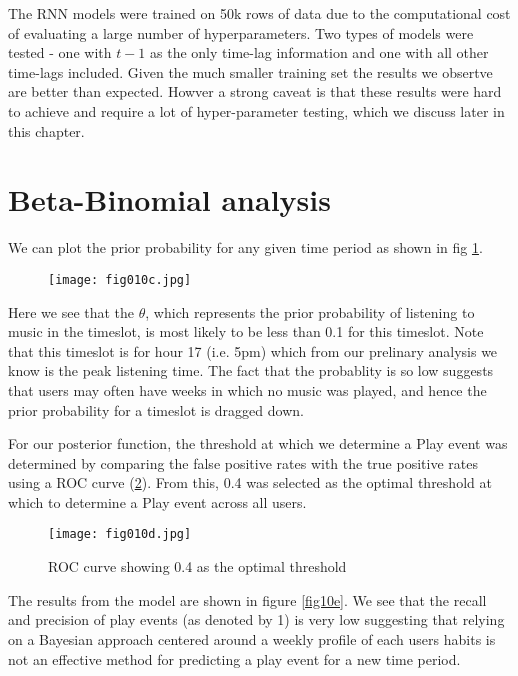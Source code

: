 The RNN models were trained on 50k rows of data due to the computational cost of evaluating a large number of hyperparameters. Two types of models were tested - one with $t-1$ as the only time-lag information and one with all other time-lags included. Given the much smaller training set the results we obsertve are better than expected. Howver a strong caveat is that these results were hard to achieve and require a lot of hyper-parameter testing, which we discuss later in this chapter.

\section{Beta-Binomial analysis}

We can plot the prior probability for any given time period as shown in fig \ref{fig10c}.

\begin{figure}[h!]
	\centering
	\texttt{[image: fig010c.jpg]}
	\caption{}
	\label{fig10c}
\end{figure} 

Here we see that the $\theta$, which represents the prior probability of listening to music in the timeslot, is most likely to be less than 0.1 for this timeslot. Note that this timeslot is for hour 17 (i.e. 5pm) which from our prelinary analysis we  know is the peak listening time. The fact that the probablity is so low suggests that users may often have weeks in which no music was played, and hence the prior probability for a timeslot is dragged down. 

For our posterior function, the threshold at which we determine a Play event was determined by comparing the false positive rates with the true positive rates using a ROC curve (\ref{fig10d}). From this, 0.4 was selected as the optimal threshold at which to determine a Play event across all users.

\begin{figure}[h!]
	\centering
	\texttt{[image: fig010d.jpg]}
	\caption{ROC curve showing 0.4 as the optimal threshold}
	\label{fig10d}
\end{figure} 

The results from the model are shown in figure \ref{fig10e}. We see that the recall and precision of play events (as denoted by 1) is very low suggesting that relying on a Bayesian approach centered around a weekly profile of each users habits is not an effective method for predicting a play event for a new time period.

